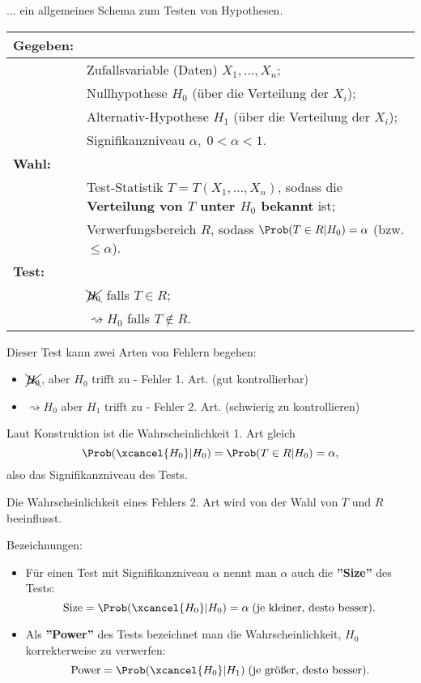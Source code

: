 \documentclass{tstextbook}
\begin{document}
$\ldots$ ein allgemeines Schema zum Testen von Hypothesen. 
\vspace{0.5cm}

\begin{tabular}{ll}
	\textbf{Gegeben:}	& 	\\
	\midrule
				& Zufallsvariable (Daten) $ X_1,\ldots, X_n $; \\
				& Nullhypothese $ H_0 $ (über die Verteilung der $ X_i $); \\
				& Alternativ-Hypothese $ H_1 $ (über die Verteilung der $ X_i $); \\
				& Signifikanzniveau $ \alpha, \; 0<\alpha<1. $ \\
	
	\textbf{Wahl: }		& \\
	\midrule
				& Test-Statistik $ T = T(X_1,\ldots,X_n) $, sodass die \textbf{Verteilung von $ T $ unter $ H_0 $ bekannt} ist; \\
				& Verwerfungsbereich $ R $, sodass $ \Prob(T\in R|H_0) = \alpha $ (bzw. $ \le \alpha $). \\
	
	\textbf{Test: }		& \\
	\midrule
				&  $ \xcancel{H_0} $ falls $ T\in R $; \\
				& $ \rightsquigarrow H_0 $ falls $ T\notin R $.
\end{tabular}
\vspace{0.5cm}

Dieser Test kann zwei Arten von Fehlern begehen:
\begin{itemize}
	\item $ \xcancel{H_0} $, aber $ H_0 $ trifft zu - Fehler 1. Art. (gut kontrollierbar)
	\item $ \rightsquigarrow H_0 $ aber $ H_1 $ trifft zu - Fehler 2. Art. (schwierig zu kontrollieren)
\end{itemize}

Laut Konstruktion ist die Wahrscheinlichkeit 1. Art gleich 
	\[
	\Prob(\xcancel{H_0}|H_0) = \Prob(T\in R|H_0) = \alpha,
	\]
also das Signifikanzniveau des Tests.

Die Wahrscheinlichkeit eines Fehlers 2. Art wird von der Wahl von $ T $ und $ R $ beeinflusst. 

\begin{remark}
	Bezeichnungen: 
	\begin{itemize}
		\item Für einen Test mit Signifikanzniveau $ \alpha $ nennt man $ \alpha $ auch die \textbf{''Size''} des Tests:
		\[
		\text{Size} = \Prob(\xcancel{H_0}|H_0)=\alpha \; (\text{je kleiner, desto besser}).
		\]
		\item Als \textbf{''Power''} des Tests bezeichnet man die Wahrscheinlichkeit, $ H_0 $ korrekterweise zu verwerfen:
		\[
		\text{Power} = \Prob(\xcancel{H_0}|H_1) \; (\text{je größer, desto besser}).
		\]
	\end{itemize}
\end{remark}
\end{document}
